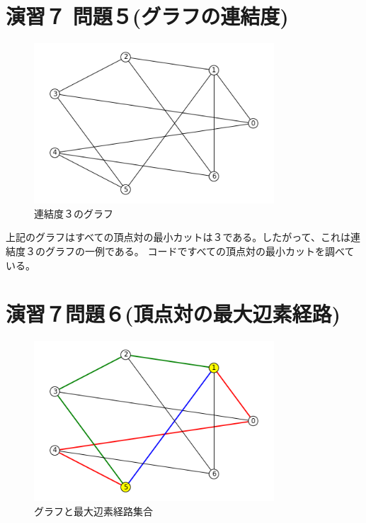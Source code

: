 \documentclass{report}
\begin{document}
\begin{CJK}{UTF8}{min}
    \section*{演習７ 問題５(グラフの連結度)}
    \begin{figure}[!h]
        \centerline{\includegraphics[width=0.8\textwidth]{data/12.png}}
        \caption{連結度３のグラフ}
    \end{figure}
    上記のグラフはすべての頂点対の最小カットは３である。したがって、これは連結度３のグラフの一例である。
    コードですべての頂点対の最小カットを調べている。

    \clearpage
    \section*{演習７問題６(頂点対の最大辺素経路)}
    \begin{figure}[!h]
        \centerline{\includegraphics[width=0.8\textwidth]{data/13.png}}
        \caption{グラフと最大辺素経路集合}
    \end{figure}


\end{CJK}
\end{document}
